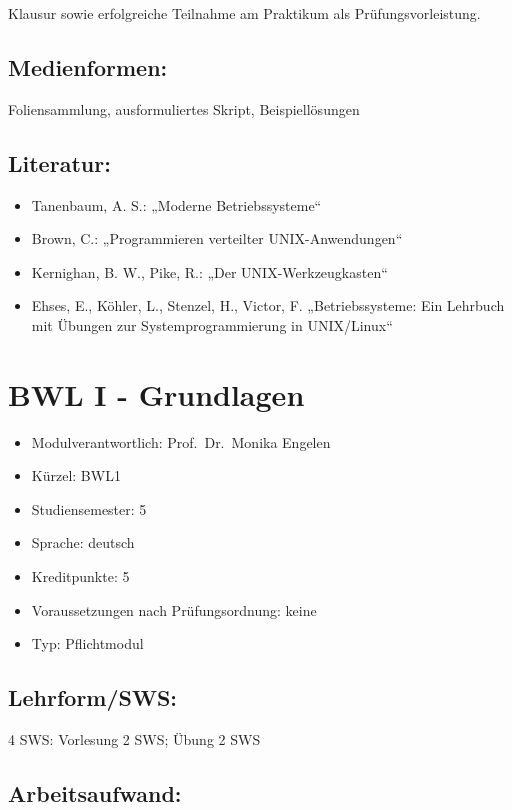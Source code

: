 Klausur sowie erfolgreiche Teilnahme am Praktikum als
Prüfungsvorleistung.

\section*{Medienformen:}\label{medienformen-3}

Foliensammlung, ausformuliertes Skript, Beispiellösungen

\section*{Literatur:}\label{literatur-3}

\begin{itemize}
\tightlist
\item
  Tanenbaum, A. S.: „Moderne Betriebssysteme``
\item
  Brown, C.: „Programmieren verteilter UNIX-Anwendungen``
\item
  Kernighan, B. W., Pike, R.: „Der UNIX-Werkzeugkasten``
\item
  Ehses, E., Köhler, L., Stenzel, H., Victor, F. „Betriebssysteme: Ein
  Lehrbuch mit Übungen zur Systemprogrammierung in UNIX/Linux``
\end{itemize}

\chapter{BWL I - Grundlagen}\label{bwl-i---grundlagen}

\begin{itemize}
\tightlist
\item
  Modulverantwortlich: Prof.~Dr.~Monika Engelen
\item
  Kürzel: BWL1
\item
  Studiensemester: 5
\item
  Sprache: deutsch
\item
  Kreditpunkte: 5
\item
  Voraussetzungen nach Prüfungsordnung: keine
\item
  Typ: Pflichtmodul
\end{itemize}

\section*{Lehrform/SWS:}\label{lehrformsws-6}

4 SWS: Vorlesung 2 SWS; Übung 2 SWS

\section*{Arbeitsaufwand:}\label{arbeitsaufwand-6}

